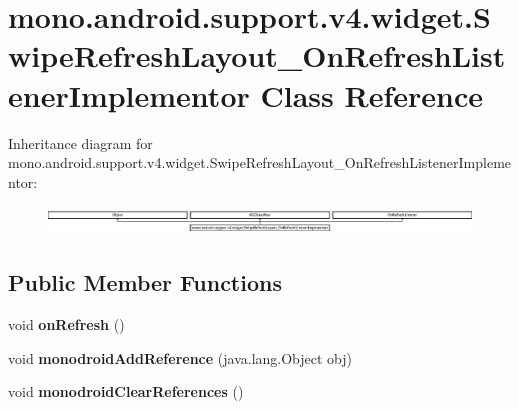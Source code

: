 \hypertarget{classmono_1_1android_1_1support_1_1v4_1_1widget_1_1_swipe_refresh_layout___on_refresh_listener_implementor}{}\section{mono.\+android.\+support.\+v4.\+widget.\+Swipe\+Refresh\+Layout\+\_\+\+On\+Refresh\+Listener\+Implementor Class Reference}
\label{classmono_1_1android_1_1support_1_1v4_1_1widget_1_1_swipe_refresh_layout___on_refresh_listener_implementor}
Inheritance diagram for mono.\+android.\+support.\+v4.\+widget.\+Swipe\+Refresh\+Layout\+\_\+\+On\+Refresh\+Listener\+Implementor\+:\begin{figure}[H]
\begin{center}
\leavevmode
\includegraphics[height=0.745176cm]{classmono_1_1android_1_1support_1_1v4_1_1widget_1_1_swipe_refresh_layout___on_refresh_listener_implementor}
\end{center}
\end{figure}
\subsection*{Public Member Functions}
\begin{DoxyCompactItemize}
\item 
\mbox{\label{classmono_1_1android_1_1support_1_1v4_1_1widget_1_1_swipe_refresh_layout___on_refresh_listener_implementor_a74f3896d97f8baf7046389f758407a1c}} 
void {\bfseries on\+Refresh} ()
\item 
\mbox{\label{classmono_1_1android_1_1support_1_1v4_1_1widget_1_1_swipe_refresh_layout___on_refresh_listener_implementor_a422bf9708796c9a0bcaaec2137d8200a}} 
void {\bfseries monodroid\+Add\+Reference} (java.\+lang.\+Object obj)
\item 
\mbox{\label{classmono_1_1android_1_1support_1_1v4_1_1widget_1_1_swipe_refresh_layout___on_refresh_listener_implementor_a2669d5c1b40a370723a749b9aa381407}} 
void {\bfseries monodroid\+Clear\+References} ()
\end{DoxyCompactItemize}
